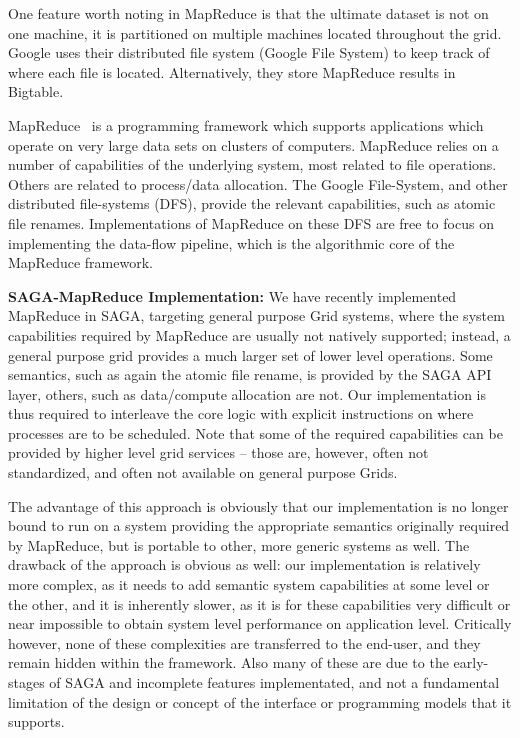 \documentclass[conference,final]{IEEEtran}
\begin{document}
One feature worth noting in MapReduce is that the ultimate dataset is
not on one machine, it is partitioned on multiple machines located
throughout the grid. Google uses their distributed file system (Google
File System) to keep track of where each file is located.
Alternatively, they store MapReduce results in Bigtable.  %

MapReduce~\cite{mapreduce-paper} is a programming framework which
supports applications which operate on very large data sets on
clusters of computers.  MapReduce relies on a number of capabilities
of the underlying system, most related to file operations.  Others are
related to process/data allocation.  The Google File-System, and other
distributed file-systems (DFS), provide the relevant capabilities,
such as atomic file renames.  Implementations of MapReduce on these
DFS are free to focus on implementing the data-flow pipeline, which is
the algorithmic core of the MapReduce framework.

{\bf SAGA-MapReduce Implementation:} We have recently implemented
MapReduce in SAGA, targeting general purpose Grid systems, where the
system capabilities required by MapReduce are usually not natively
supported; instead, a general purpose grid provides a much larger set
of lower level operations.  Some semantics, such as again the atomic
file rename, is provided by the SAGA API layer, others, such as
data/compute allocation are not.  Our implementation is thus required
to interleave the core logic with explicit instructions on where
processes are to be scheduled.  Note that some of the required
capabilities can be provided by higher level grid services -- those
are, however, often not standardized, and often not available on
general purpose Grids.

The advantage of this approach is obviously that our implementation is
no longer bound to run on a system providing the appropriate semantics
originally required by MapReduce, but is portable to other, more
generic systems as well.  The drawback of the approach is obvious as
well: our implementation is relatively more complex, as it needs to
add semantic system capabilities at some level or the other, and it is
inherently slower, as it is for these capabilities very difficult or
near impossible to obtain system level performance on application
level.  Critically however, none of these complexities are transferred
to the end-user, and they remain hidden within the framework. Also
many of these are due to the early-stages of SAGA and incomplete
features implementated, and not a fundamental limitation of the design
or concept of the interface or programming models that it supports.
\end{document}
